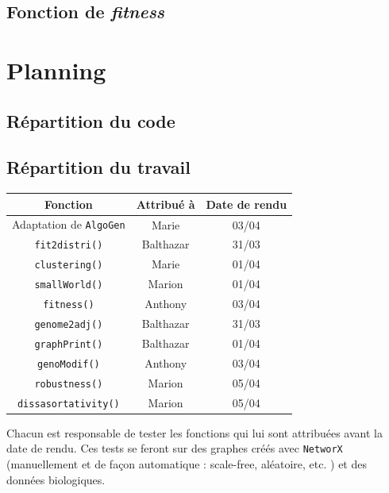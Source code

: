 \subsection{Fonction de \textit{fitness} }

\section{Planning}
\subsection{Répartition du code}

\subsection{Répartition du travail}

\begin{center}
\begin{table}[!h]
\begin{tabular}{|c|c|c|}
\hline \textbf{Fonction} & \textbf{Attribué à} & \textbf{Date de rendu} \\
\hline
Adaptation de \verb?AlgoGen? & Marie & 03/04 \\
\hline
\verb?fit2distri()? & Balthazar & 31/03 \\
\hline
\verb?clustering()? & Marie & 01/04\\
\hline 
\verb?smallWorld()? & Marion & 01/04\\
\hline
\verb?fitness()? & Anthony & 03/04\\
\hline 
\verb?genome2adj()? & Balthazar & 31/03 \\
\hline 
\verb?graphPrint()? & Balthazar & 01/04 \\
\hline 
\verb?genoModif()? & Anthony & 03/04 \\
\hline 
\verb?robustness()? & Marion & 05/04 \\
\hline 
\verb?dissasortativity()? & Marion & 05/04\\
\hline 
\end{tabular}
\end{table}
\end{center}

Chacun est responsable de tester les fonctions qui lui sont attribuées avant la date de rendu. Ces tests se feront sur des graphes créés avec \verb?NetworX? (manuellement et de façon automatique : scale-free, aléatoire, etc. ) et des données biologiques.

